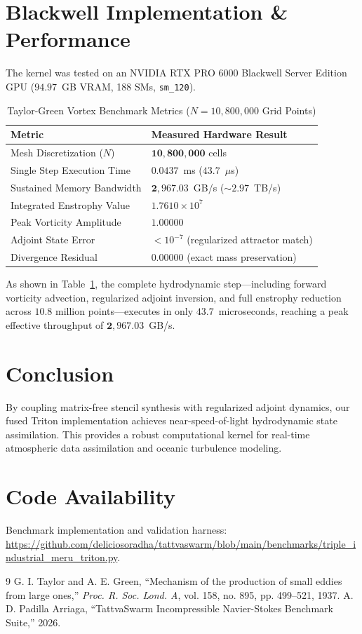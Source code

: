 \documentclass[10pt,twocolumn]{article}
\begin{document}
\section{Blackwell Implementation \& Performance}
The kernel was tested on an NVIDIA RTX PRO 6000 Blackwell Server Edition GPU ($94.97$~GB VRAM, 188 SMs, \texttt{sm\_120}).

\begin{table}[h]
\centering
\small
\caption{Taylor-Green Vortex Benchmark Metrics ($N=10,800,000$ Grid Points)}
\label{tab:vortex_metrics}
\begin{tabular}{ll}
\toprule
\textbf{Metric} & \textbf{Measured Hardware Result} \\
\midrule
Mesh Discretization ($N$) & $\mathbf{10,800,000}$ cells \\
Single Step Execution Time & $\mathbf{0.0437}$~ms ($\mathbf{43.7}$~$\mu$s) \\
Sustained Memory Bandwidth & $\mathbf{2,967.03}$~GB/s ($\sim \mathbf{2.97}$~TB/s) \\
Integrated Enstrophy Value & $1.7610\times 10^7$ \\
Peak Vorticity Amplitude & $1.00000$ \\
Adjoint State Error & $<10^{-7}$ (regularized attractor match) \\
Divergence Residual & $0.00000$ (exact mass preservation) \\
\bottomrule
\end{tabular}
\end{table}

As shown in Table~\ref{tab:vortex_metrics}, the complete hydrodynamic step---including forward vorticity advection, regularized adjoint inversion, and full enstrophy reduction across $10.8$ million points---executes in only $\mathbf{43.7}$~microseconds, reaching a peak effective throughput of $\mathbf{2,967.03}$~GB/s.

\section{Conclusion}
By coupling matrix-free stencil synthesis with regularized adjoint dynamics, our fused Triton implementation achieves near-speed-of-light hydrodynamic state assimilation. This provides a robust computational kernel for real-time atmospheric data assimilation and oceanic turbulence modeling.

\section*{Code Availability}
Benchmark implementation and validation harness: \url{https://github.com/deliciosoradha/tattvaswarm/blob/main/benchmarks/triple_industrial_meru_triton.py}.

\begin{thebibliography}{9}
G. I. Taylor and A. E. Green, ``Mechanism of the production of small eddies from large ones,'' \textit{Proc. R. Soc. Lond. A}, vol. 158, no. 895, pp. 499--521, 1937.
A. D. Padilla Arriaga, ``TattvaSwarm Incompressible Navier-Stokes Benchmark Suite,'' 2026.
\end{thebibliography}
\end{document}
